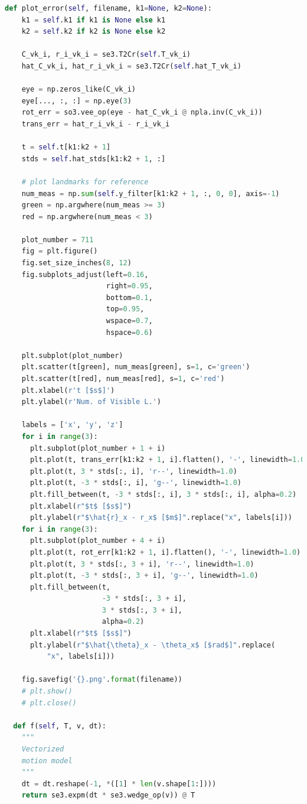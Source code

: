 \documentclass[a4paper]{article}
\begin{document}
\begin{lstlisting}[language=Python, basicstyle=\small, caption=main.py]
  def plot_error(self, filename, k1=None, k2=None):
    k1 = self.k1 if k1 is None else k1
    k2 = self.k2 if k2 is None else k2

    C_vk_i, r_i_vk_i = se3.T2Cr(self.T_vk_i)
    hat_C_vk_i, hat_r_i_vk_i = se3.T2Cr(self.hat_T_vk_i)

    eye = np.zeros_like(C_vk_i)
    eye[..., :, :] = np.eye(3)
    rot_err = so3.vee_op(eye - hat_C_vk_i @ npla.inv(C_vk_i))
    trans_err = hat_r_i_vk_i - r_i_vk_i

    t = self.t[k1:k2 + 1]
    stds = self.hat_stds[k1:k2 + 1, :]

    # plot landmarks for reference
    num_meas = np.sum(self.y_filter[k1:k2 + 1, :, 0, 0], axis=-1)
    green = np.argwhere(num_meas >= 3)
    red = np.argwhere(num_meas < 3)

    plot_number = 711
    fig = plt.figure()
    fig.set_size_inches(8, 12)
    fig.subplots_adjust(left=0.16,
                        right=0.95,
                        bottom=0.1,
                        top=0.95,
                        wspace=0.7,
                        hspace=0.6)

    plt.subplot(plot_number)
    plt.scatter(t[green], num_meas[green], s=1, c='green')
    plt.scatter(t[red], num_meas[red], s=1, c='red')
    plt.xlabel(r't [$s$]')
    plt.ylabel(r'Num. of Visible L.')

    labels = ['x', 'y', 'z']
    for i in range(3):
      plt.subplot(plot_number + 1 + i)
      plt.plot(t, trans_err[k1:k2 + 1, i].flatten(), '-', linewidth=1.0)
      plt.plot(t, 3 * stds[:, i], 'r--', linewidth=1.0)
      plt.plot(t, -3 * stds[:, i], 'g--', linewidth=1.0)
      plt.fill_between(t, -3 * stds[:, i], 3 * stds[:, i], alpha=0.2)
      plt.xlabel(r"$t$ [$s$]")
      plt.ylabel(r"$\hat{r}_x - r_x$ [$m$]".replace("x", labels[i]))
    for i in range(3):
      plt.subplot(plot_number + 4 + i)
      plt.plot(t, rot_err[k1:k2 + 1, i].flatten(), '-', linewidth=1.0)
      plt.plot(t, 3 * stds[:, 3 + i], 'r--', linewidth=1.0)
      plt.plot(t, -3 * stds[:, 3 + i], 'g--', linewidth=1.0)
      plt.fill_between(t,
                       -3 * stds[:, 3 + i],
                       3 * stds[:, 3 + i],
                       alpha=0.2)
      plt.xlabel(r"$t$ [$s$]")
      plt.ylabel(r"$\hat{\theta}_x - \theta_x$ [$rad$]".replace(
          "x", labels[i]))

    fig.savefig('{}.png'.format(filename))
    # plt.show()
    # plt.close()

  def f(self, T, v, dt):
    """
    Vectorized
    motion model
    """
    dt = dt.reshape(-1, *([1] * len(v.shape[1:])))
    return se3.expm(dt * se3.wedge_op(v)) @ T


\end{lstlisting}
\end{document}
